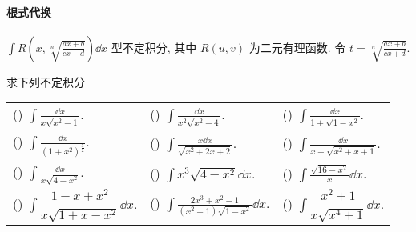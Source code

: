 \paragraph{根式代换}
$\displaystyle \int R\left(x, \sqrt[n]{\frac{a x+b}{c x+d}}\right) \dd  x $ 型不定积分,
其中 $ R(u, v) $ 为二元有理函数. 令 $\displaystyle t=\sqrt[n]{\frac{a x+b}{c x+d}} .$
\begin{example}
    求下列不定积分
    \setcounter{magicrownumbers}{0}
    \begin{table}[H]
        \centering
        \begin{tabular}{l | l | l}
            (\rownumber{}) $\displaystyle\int\frac{\dd x}{x\sqrt{x^2-1}}.$                    & (\rownumber{}) $\displaystyle\int\frac{\dd x}{x^2\sqrt{x^2-4}}.$                          & (\rownumber{}) $\displaystyle\int\frac{\dd x}{1+\sqrt{1-x^2}}.$      \\
            (\rownumber{}) $\displaystyle\int\frac{\dd x}{\left(1+x^2\right)^{\frac{3}{2}}}.$ & (\rownumber{}) $\displaystyle\int\frac{x\dd x}{\sqrt{x^2+2x+2}}.$                         & (\rownumber{}) $\displaystyle\int\frac{\dd x}{x+\sqrt{x^2+x+1}}.$    \\
            (\rownumber{}) $\displaystyle\int\frac{\dd x}{x\sqrt{4-x^2}}.$                    & (\rownumber{}) $\displaystyle\int x^3\sqrt{4-x^2}\dd x.$                                  & (\rownumber{}) $\displaystyle\int\frac{\sqrt{16-x^2}}{x}\dd x.$      \\
            (\rownumber{}) $\displaystyle\int\dfrac{1-x+x^2}{x\sqrt{1+x-x^2}}\dd x.$          & (\rownumber{}) $\displaystyle\int\frac{2x^3+x^2-1}{\left(x^2-1\right)\sqrt{1-x^2}}\dd x.$ & (\rownumber{}) $\displaystyle\int\dfrac{x^2+1}{x\sqrt{x^4+1}}\dd x.$
        \end{tabular}
    \end{table}
\end{example}

